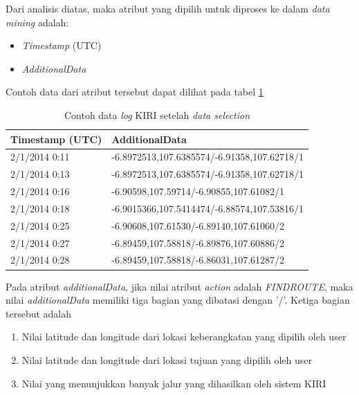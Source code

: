 Dari analisis diatas, maka atribut yang dipilih untuk diproses ke dalam \textsl{data mining} adalah:
\begin{itemize}
	\item \textsl{Timestamp} (UTC)
	\item \textsl{AdditionalData}
\end{itemize}

Contoh data dari atribut tersebut dapat dilihat pada tabel \ref{table:contohDataLog}
\begin{table}[h]
\centering
\caption{Contoh data \textsl{log} KIRI setelah \textsl{data selection}}
\label{table:contohDataLog}
\begin{tabular}{|l|l|}
\hline
\textbf{Timestamp (UTC)} & \textbf{AdditionalData}                     \\ \hline
2/1/2014 0:11            & -6.8972513,107.6385574/-6.91358,107.62718/1 \\ \hline
2/1/2014 0:13            & -6.8972513,107.6385574/-6.91358,107.62718/1 \\ \hline
2/1/2014 0:16            & -6.90598,107.59714/-6.90855,107.61082/1     \\ \hline
2/1/2014 0:18            & -6.9015366,107.5414474/-6.88574,107.53816/1 \\ \hline
2/1/2014 0:25            & -6.90608,107.61530/-6.89140,107.61060/2     \\ \hline
2/1/2014 0:27            & -6.89459,107.58818/-6.89876,107.60886/2     \\ \hline
2/1/2014 0:28            & -6.89459,107.58818/-6.86031,107.61287/2     \\ \hline
\end{tabular}
\end{table}

Pada atribut \textsl{additionalData}, jika nilai atribut \textsl{action} adalah \textsl{FINDROUTE}, maka nilai \textsl{additionalData} memiliki tiga bagian yang dibatasi dengan '/'. Ketiga bagian tersebut adalah

\begin{enumerate}
	\item Nilai latitude dan longitude dari lokasi keberangkatan yang dipilih oleh user
	\item Nilai latitude dan longitude dari lokasi tujuan yang dipilih oleh user
	\item Nilai yang menunjukkan banyak jalur yang dihasilkan oleh sistem KIRI
\end{enumerate}

